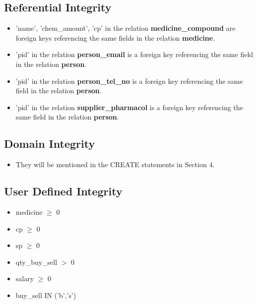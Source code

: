 \documentclass[a4papaer]{article}
\begin{document}
	\subsection{Referential Integrity}
		\begin{itemize}
			\item 'name', 'chem\_amount', 'cp' in the relation {\bf medicine\_compound} are foreign keys referencing the same fields in the relation {\bf medicine}.
			\item 'pid' in the relation {\bf person\_email} is a foreign key referencing the same field in the relation {\bf person}.
			\item 'pid' in the relation {\bf person\_tel\_no} is a foreign key referencing the same field in the relation {\bf person}.
			\item 'pid' in the relation {\bf supplier\_pharmacol} is a foreign key referencing the same field in the relation {\bf person}.
		\end{itemize}
	\subsection{Domain Integrity}
		\begin{itemize}
			\item They will be mentioned in the CREATE statements in Section 4.
		\end{itemize}
	\subsection{User Defined Integrity}
		\begin{itemize}
			\item medicine $\geq$ 0
			\item cp $\geq$ 0
			\item sp $\geq$ 0
			\item qty\_buy\_sell $>$ 0
			\item salary $\geq$ 0
			\item buy\_sell IN ('b','s')
		\end{itemize}
\end{document}
